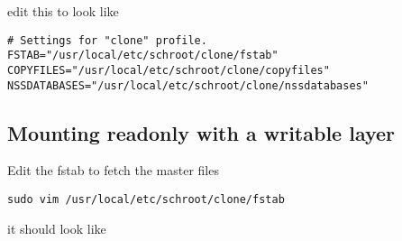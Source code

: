 \documentclass[a4paper]{book}
\begin{document}
edit this to look like

\begin{verbatim}
# Settings for "clone" profile.
FSTAB="/usr/local/etc/schroot/clone/fstab"
COPYFILES="/usr/local/etc/schroot/clone/copyfiles"
NSSDATABASES="/usr/local/etc/schroot/clone/nssdatabases"
\end{verbatim}

\subsection{Mounting readonly with a writable layer}

Edit the fstab to fetch the master files

\begin{verbatim}
sudo vim /usr/local/etc/schroot/clone/fstab
\end{verbatim}

it should look like
\end{document}
